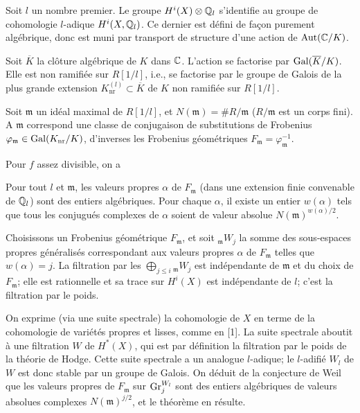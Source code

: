 \documentclass[8pt]{extarticle}
\begin{document}
 Soit \(l\) un nombre premier. Le groupe \(H^i(X)\otimes\mathbb{Q}_l\) s'identifie au groupe de cohomologie \(l\)-adique \(H^i(X,\mathbb{Q}_l)\). Ce dernier est défini de façon purement algébrique, donc est muni par transport de structure d'une action de \(\operatorname{Aut}(\mathbb{C}/K)\).

 Soit \(\overline K\) la clôture algébrique de \(K\) dans \(\mathbb{C}\). L'action se factorise par \(\operatorname{Gal}(\overline K/K)\). Elle est non ramifiée sur \(R[1/l]\), i.e., se factorise par le groupe de Galois de la plus grande extension \(K_{\mathrm{nr}}^{(l)}\subset\overline K\) de \(K\) non ramifiée sur \(R[1/l]\).

 Soit \(\mathfrak m\) un idéal maximal de \(R[1/l]\), et \(N(\mathfrak m)=\#R/\mathfrak m\) (\(R/\mathfrak m\) est un corps fini). A \(\mathfrak m\) correspond une classe de conjugaison de substitutions de Frobenius \(\varphi_{\mathfrak m}\in\operatorname{Gal}(K_{\mathrm{nr}}/K)\), d'inverses les Frobenius géométriques \(F_{\mathfrak m}=\varphi_{\mathfrak m}^{-1}\).

 Pour \(f\) assez divisible, on a\EndTheorem
\EndSourcePage

\ReaderFont
{} Pour tout \(l\) et \(\mathfrak m\), les valeurs propres \(\alpha\) de \(F_{\mathfrak m}\) (dans une extension finie convenable de \(\mathbb{Q}_l\)) sont des entiers algébriques. Pour chaque \(\alpha\), il existe un entier \(w(\alpha)\) tels que tous les conjugués complexes de \(\alpha\) soient de valeur absolue \(N(\mathfrak m)^{w(\alpha)/2}\).

 Choisissons un Frobenius géométrique \(F_{\mathfrak m}\), et soit \({}_{\mathfrak m}W_j\) la somme des sous-espaces propres généralisés correspondant aux valeurs propres \(\alpha\) de \(F_{\mathfrak m}\) telles que \(w(\alpha)=j\). La filtration par les \(\bigoplus_{j\le i}{}_{\mathfrak m}W_j\) est indépendante de \(\mathfrak m\) et du choix de \(F_{\mathfrak m}\); elle est rationnelle et sa trace sur \(H^i(X)\) est indépendante de \(l\); c'est la filtration par le poids.\EndTheorem

\ProofHeadFR On exprime (via une suite spectrale) la cohomologie de \(X\) en terme de la cohomologie de variétés propres et lisses, comme en [1]. La suite spectrale aboutit à une filtration \(W\) de \(H^*(X)\), qui est par définition la filtration par le poids de la théorie de Hodge. Cette suite spectrale a un analogue \(l\)-adique; le \(l\)-adifié \(W_l\) de \(W\) est donc stable par un groupe de Galois. On déduit de la conjecture de Weil que les valeurs propres de \(F_{\mathfrak m}\) sur \(\operatorname{Gr}_j^{W_l}\) sont des entiers algébriques de valeurs absolues complexes \(N(\mathfrak m)^{j/2}\), et le théorème en résulte.
\end{document}
